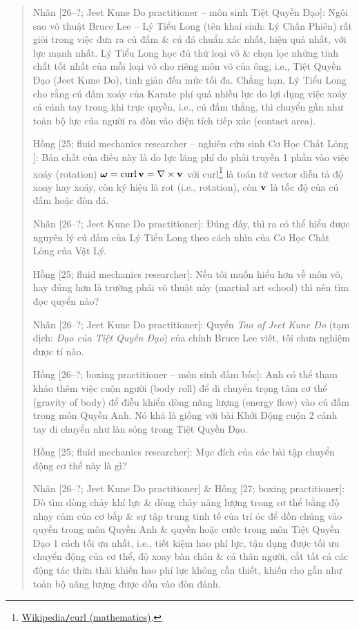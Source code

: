 \documentclass[12pt]{article}
\begin{document}
\begin{quote}
	{\sf Nhân [26--?; Jeet Kune Do practitioner -- môn sinh Tiệt Quyền Đạo]}: Ngôi sao võ thuật {\sc Bruce Lee -- Lý Tiểu Long} (tên khai sinh: {\sc Lý Chấn Phiên}) rất giỏi trong việc đưa ra cú đấm \& cú đá chuẩn xác nhất, hiệu quả nhất, với lực mạnh nhất. Lý Tiểu Long học đủ thứ loại võ \& chọn lọc những tinh chất tốt nhất của mỗi loại võ cho riêng môn võ của ông, i.e., Tiệt Quyền Đạo (Jeet Kune Do), tinh giản đến mức tối đa. Chẳng hạn, Lý Tiểu Long cho rằng cú đấm xoáy của Karate phí quá nhiều lực do lợi dụng việc xoáy cả cánh tay trong khi trực quyền, i.e., cú đấm thẳng, thì chuyển gần như toàn bộ lực của người ra đòn vào diện tích tiếp xúc (contact area).
	
	{\sf Hồng [25; fluid mechanics researcher -- nghiên cứu sinh Cơ Học Chất Lỏng ]}: Bản chất của điều này là do lực lãng phí do phải truyền 1 phần vào việc xoáy (rotation) $\boldsymbol{\omega} = \operatorname{curl}{\bf v} = \nabla\times{\bf v}$ với curl\footnote{\href{https://en.wikipedia.org/wiki/Curl_(mathematics)}{Wikipedia{\tt/}curl (mathematics)}.} là toán tử vector diễn tả độ xoay hay xoáy, còn ký hiệu là rot (i.e., rotation), còn ${\bf v}$ là tốc độ của cú đấm hoặc đòn đá.
	
	{\sf Nhân [26--?; Jeet Kune Do practitioner]}: Đúng đấy, thì ra có thể hiểu được nguyên lý cú đấm của Lý Tiểu Long theo cách nhìn của Cơ Học Chất Lỏng của Vật Lý.
	
	{\sf Hồng [25; fluid mechanics researcher]}: Nếu tôi muốn hiểu hơn về môn võ, hay đúng hơn là trường phái võ thuật này (martial art school) thì nên tìm đọc quyển nào?
	
	{\sf Nhân [26--?; Jeet Kune Do practitioner]}: Quyển {\it Tao of Jeet Kune Do} \cite{Lee2011} (tạm dịch: {\it Đạo của Tiệt Quyền Đạo}) của chính {\sc Bruce Lee} viết, tôi chưa nghiệm được tí nào.
	
	{\sf Hồng [26--?; boxing practitioner -- môn sinh đấm bốc]}: Anh có thể tham khảo thêm việc cuộn người (body roll) để di chuyển trọng tâm cơ thể (gravity of body) để điều khiển dòng năng lượng (energy flow) vào cú đấm trong môn Quyền Anh. Nó khá là giống với bài Khởi Động cuộn 2 cánh tay di chuyển như làn sóng trong Tiệt Quyền Đạo.
	
	{\sf Hồng [25; fluid mechanics researcher]}: Mục đích của các bài tập chuyển động cơ thể này là gì?
	
	{\sf Nhân [26--?; Jeet Kune Do practitioner] \& Hồng [27; boxing practitioner]}: Dò tìm dòng chảy khí lực \& dòng chảy năng lượng trong cơ thể bằng độ nhạy cảm của cơ bắp \& sự tập trung tinh tế của trí óc để dồn chúng vào quyền trong môn Quyền Anh \& quyền hoặc cước trong môn Tiệt Quyền Đạo 1 cách tối ưu nhất, i.e., tiết kiệm hao phí lực, tận dụng được tối ưu chuyển động của cơ thể, độ xoay bàn chân \& cả thân người, cắt tất cả các động tác thừa thãi khiến hao phí lực không cần thiết, khiến cho gần như toàn bộ năng lượng được dồn vào đòn đánh.
	

\end{quote}
\end{document}
